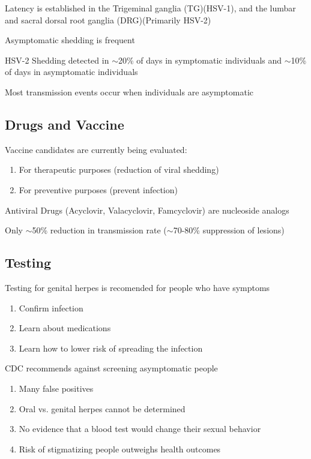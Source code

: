 \documentclass{notes}
\begin{document}
Latency is established in the Trigeminal ganglia (TG)(HSV-1), and the lumbar and sacral dorsal root ganglia (DRG)(Primarily HSV-2)

Asymptomatic shedding is frequent

\tab HSV-2 Shedding detected in \(\sim\)20\% of days in symptomatic individuals and \(\sim\)10\% of days in asymptomatic individuals

\tab Most transmission events occur when individuals are asymptomatic

\subsection{Drugs and Vaccine}

Vaccine candidates are currently being evaluated:

\begin{enumerate}
    \item For therapeutic purposes (reduction of viral shedding)
    \item For preventive purposes (prevent infection)
\end{enumerate}

Antiviral Drugs (Acyclovir, Valacyclovir, Famcyclovir) are nucleoside analogs

\tab Only \(\sim\)50\% reduction in transmission rate (\(\sim\)70-80\% suppression of lesions)

\subsection{Testing}

Testing for genital herpes is recomended for people who have symptoms

\begin{enumerate}
    \item Confirm infection
    \item Learn about medications
    \item Learn how to lower risk of spreading the infection
\end{enumerate}

CDC recommends against screening asymptomatic people

\begin{enumerate}
    \item Many false positives
    \item Oral vs. genital herpes cannot be determined
    \item No evidence that a blood test would change their sexual behavior
    \item Risk of stigmatizing people outweighs health outcomes
\end{enumerate}
\end{document}
